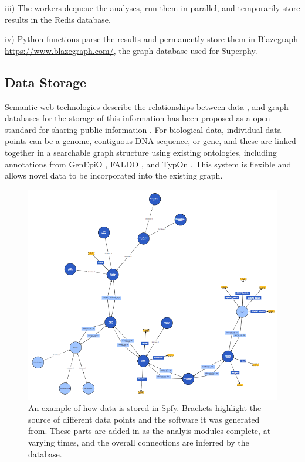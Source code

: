\documentclass{article}
\begin{document}
iii) The workers dequeue the analyses, run them in parallel, and temporarily store results in the Redis database.

iv) Python functions parse the results and permanently store them in Blazegraph \url{https://www.blazegraph.com/}, the graph database used for Superphy.

\subsection{Data Storage}
Semantic web technologies describe the relationships between data \cite{berners2001semantic}, and graph databases for the storage of this information has been proposed as a open standard for sharing public information \cite{horrocks2005semantic}. For biological data, individual data points can be a genome, contiguous DNA sequence, or gene, and these are linked together in a searchable graph structure using existing ontologies, including annotations from GenEpiO \cite{griffiths2017context}, FALDO \cite{bolleman2016faldo}, and TypOn \cite{vaz2014typon}. This system is flexible and allows novel data to be incorporated into the existing graph.
\begin{figure}[!hb]
\begin{center}
\includegraphics[width=\textwidth]{images/ontology}
\end{center}
\caption{An example of how data is stored in Spfy. Brackets highlight the source of different data points and the software it was generated from. These parts are added in as the analyis modules complete, at varying times, and the overall connections are inferred by the database.}
\label{fig-ontology}
\end{figure}
\end{document}
